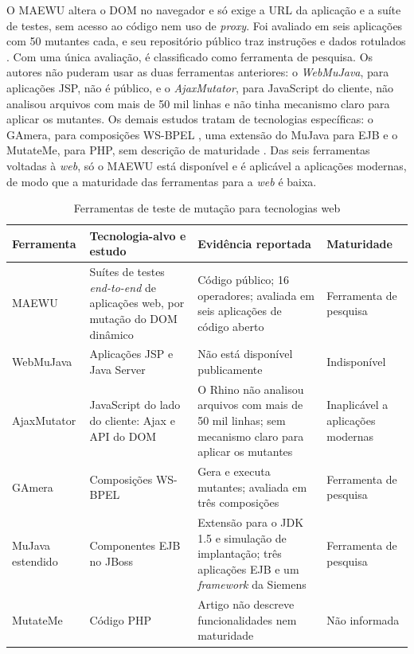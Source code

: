 O MAEWU altera o DOM no navegador e só exige a URL da aplicação e a suíte de testes, sem acesso ao código nem uso de \textit{proxy}. Foi avaliado em seis aplicações com 50 mutantes cada, e seu repositório público traz instruções e dados rotulados \cite{yandrapally2021}. Com uma única avaliação, é classificado como ferramenta de pesquisa. Os autores não puderam usar as duas ferramentas anteriores: o \textit{WebMuJava}, para aplicações JSP, não é público, e o \textit{AjaxMutator}, para JavaScript do cliente, não analisou arquivos com mais de 50 mil linhas e não tinha mecanismo claro para aplicar os mutantes. Os demais estudos tratam de tecnologias específicas: o GAmera, para composições WS-BPEL \cite{esterobotaro2010}, uma extensão do MuJava para EJB \cite{nica2011} e o MutateMe, para PHP, sem descrição de maturidade \cite{belli2011}. Das seis ferramentas voltadas à \textit{web}, só o MAEWU está disponível e é aplicável a aplicações modernas, de modo que a maturidade das ferramentas para a \textit{web} é baixa.

\begin{table}[H]
    \centering
    \footnotesize
    \caption{Ferramentas de teste de mutação para tecnologias web}
    \label{tab:ferramentas-web}
    \begin{tabular}{|p{2.3cm}|p{4.2cm}|p{4.8cm}|p{2.7cm}|}
        \hline
        \textbf{Ferramenta} & \textbf{Tecnologia-alvo e estudo} & \textbf{Evidência reportada} & \textbf{Maturidade} \\
        \hline
        MAEWU & Suítes de testes \textit{end-to-end} de aplicações web, por mutação do DOM dinâmico \cite{yandrapally2021} & Código público; 16 operadores; avaliada em seis aplicações de código aberto & Ferramenta de pesquisa \\
        \hline
        WebMuJava & Aplicações JSP e Java Server \cite{yandrapally2021} & Não está disponível publicamente & Indisponível \\
        \hline
        AjaxMutator & JavaScript do lado do cliente: Ajax e API do DOM \cite{yandrapally2021} & O Rhino não analisou arquivos com mais de 50 mil linhas; sem mecanismo claro para aplicar os mutantes & Inaplicável a aplicações modernas \\
        \hline
        GAmera & Composições WS-BPEL \cite{esterobotaro2010} & Gera e executa mutantes; avaliada em três composições & Ferramenta de pesquisa \\
        \hline
        MuJava estendido & Componentes EJB no JBoss \cite{nica2011} & Extensão para o JDK 1.5 e simulação de implantação; três aplicações EJB e um \textit{framework} da Siemens & Ferramenta de pesquisa \\
        \hline
        MutateMe & Código PHP \cite{belli2011} & Artigo não descreve funcionalidades nem maturidade & Não informada \\
        \hline
    \end{tabular}
\end{table}

